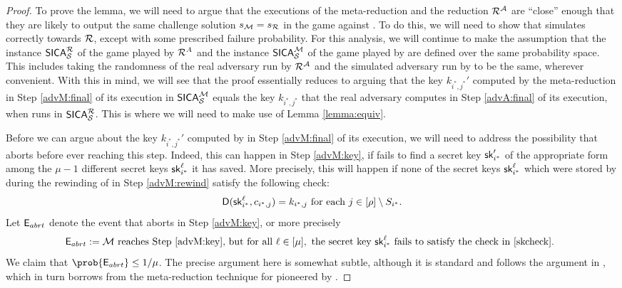 \begin{proof}
  To prove the lemma,
  we will need to argue that the executions of the meta-reduction \redM
  and the reduction \(\redR^{\advA}\) are ``close'' enough
  that they are likely to output the same challenge solution \(s_{\redM} = s_{\redR}\)
  in the \SICA game against \Simple.
  To do this, we will need to show that \redM simulates \advA
  correctly towards \(\redR\), except with some prescribed failure probability.
  For this analysis, we will continue to make the assumption that
  the instance \(\SICA_{\Simple}^{\redR}\) of the \SICA game played by \(\redR^{A}\)
  and the instance \(\mathsf{SICA}_{\mathcal{S}}^{\mathcal{M}}\) of the \SICA game played by \redM
  are defined over the same probability space.
  This includes taking the randomness of the real adversary
  \advA run by \(\redR^{\advA}\)
  and the simulated adversary run by \redM to be the same,
  wherever convenient.
  With this in mind, we will see that
  the proof essentially reduces to arguing that
  the key \(k_{i^{*},j^{*}}'\) computed by the meta-reduction
  \redM in Step \ref{advM:final} of its execution in \(\mathsf{SICA}_{\mathcal{S}}^{\mathcal{M}}\)
  equals the key \(k_{i^{*},j^{*}}\)
  that the real adversary \advA computes in Step \ref{advA:final} of its execution,
  when \redR runs \advA in \(\SICA_{\Simple}^{\redR}\).
  This is where we will need to make use of Lemma \ref{lemma:equiv}.

  Before we can argue about the key \(k_{i^{*},j^{*}}'\) computed by
  \redM in Step \ref{advM:final} of its execution,
  we will need to address the possibility that \redM aborts
  before ever reaching this step.
  Indeed, this can happen in Step \ref{advM:key},
  if \redM fails to find a secret key \(\mathsf{sk}_{i^{*}}'\)
  of the appropriate form among the \(\mu - 1\)
  different secret keys \(\mathsf{sk}_{i^{*}}^{\ell}\) it has saved.
  More precisely, this will happen if
  none of the secret keys \(\mathsf{sk}_{i^{*}}^{\ell}\)
  which were stored by \redM during the rewinding of \redR in Step \ref{advM:rewind}
  satisfy the following check:
  \begin{equation}\label{skcheck}
  \mathsf{D}(\mathsf{sk}_{i^{*}}^{\ell},c_{i^{*},j}) = k_{i^{*},j}
  \text{ for each } j \in [\rho] \setminus S_{i^{*}}.
  \end{equation}
  Let \(\mathsf{E}_{abrt}\) denote the event that \redM aborts in Step \ref{advM:key}, or more precisely
  \[
    \eventE_{abrt} := \text{\redM reaches Step \ref{advM:key}, but for all } \ell \in [\mu],
    \text{ the secret key } \sk_{i^{*}}^{\ell}
    \text{ fails to satisfy the check in \eqref{skcheck}. }
  \]
  We claim that \(\prob{\eventE_{abrt}} \le 1/\mu\).
  The precise argument here is somewhat subtle,
  although it is standard and follows the argument in ,
  which in turn borrows from the meta-reduction technique for 
  pioneered by \cite{EC:BJLS16}.


\end{proof}
